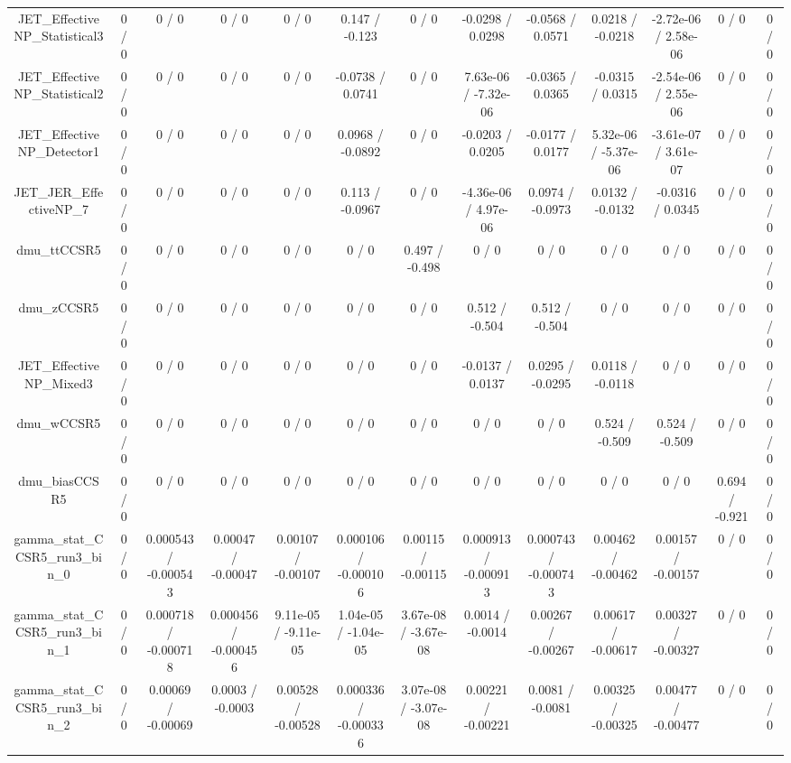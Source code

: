 \documentclass[10pt]{article}
\begin{document}
\begin{table}[htbp]
\begin{center}
\begin{tabular}{|c|c|c|c|c|c|c|c|c|c|c|c|c|}
  JET_EffectiveNP_Statistical3 & 0 / 0 & 0 / 0 & 0 / 0 & 0 / 0 & 0.147 / -0.123 & 0 / 0 & -0.0298 / 0.0298 & -0.0568 / 0.0571 & 0.0218 / -0.0218 & -2.72e-06 / 2.58e-06 & 0 / 0 & 0 / 0 \\ 
  JET_EffectiveNP_Statistical2 & 0 / 0 & 0 / 0 & 0 / 0 & 0 / 0 & -0.0738 / 0.0741 & 0 / 0 & 7.63e-06 / -7.32e-06 & -0.0365 / 0.0365 & -0.0315 / 0.0315 & -2.54e-06 / 2.55e-06 & 0 / 0 & 0 / 0 \\ 
  JET_EffectiveNP_Detector1 & 0 / 0 & 0 / 0 & 0 / 0 & 0 / 0 & 0.0968 / -0.0892 & 0 / 0 & -0.0203 / 0.0205 & -0.0177 / 0.0177 & 5.32e-06 / -5.37e-06 & -3.61e-07 / 3.61e-07 & 0 / 0 & 0 / 0 \\ 
  JET_JER_EffectiveNP_7 & 0 / 0 & 0 / 0 & 0 / 0 & 0 / 0 & 0.113 / -0.0967 & 0 / 0 & -4.36e-06 / 4.97e-06 & 0.0974 / -0.0973 & 0.0132 / -0.0132 & -0.0316 / 0.0345 & 0 / 0 & 0 / 0 \\ 
  dmu_ttCCSR5 & 0 / 0 & 0 / 0 & 0 / 0 & 0 / 0 & 0 / 0 & 0.497 / -0.498 & 0 / 0 & 0 / 0 & 0 / 0 & 0 / 0 & 0 / 0 & 0 / 0 \\ 
  dmu_zCCSR5 & 0 / 0 & 0 / 0 & 0 / 0 & 0 / 0 & 0 / 0 & 0 / 0 & 0.512 / -0.504 & 0.512 / -0.504 & 0 / 0 & 0 / 0 & 0 / 0 & 0 / 0 \\ 
  JET_EffectiveNP_Mixed3 & 0 / 0 & 0 / 0 & 0 / 0 & 0 / 0 & 0 / 0 & 0 / 0 & -0.0137 / 0.0137 & 0.0295 / -0.0295 & 0.0118 / -0.0118 & 0 / 0 & 0 / 0 & 0 / 0 \\ 
  dmu_wCCSR5 & 0 / 0 & 0 / 0 & 0 / 0 & 0 / 0 & 0 / 0 & 0 / 0 & 0 / 0 & 0 / 0 & 0.524 / -0.509 & 0.524 / -0.509 & 0 / 0 & 0 / 0 \\ 
  dmu_biasCCSR5 & 0 / 0 & 0 / 0 & 0 / 0 & 0 / 0 & 0 / 0 & 0 / 0 & 0 / 0 & 0 / 0 & 0 / 0 & 0 / 0 & 0.694 / -0.921 & 0 / 0 \\ 
  gamma_stat_CCSR5_run3_bin_0 & 0 / 0 & 0.000543 / -0.000543 & 0.00047 / -0.00047 & 0.00107 / -0.00107 & 0.000106 / -0.000106 & 0.00115 / -0.00115 & 0.000913 / -0.000913 & 0.000743 / -0.000743 & 0.00462 / -0.00462 & 0.00157 / -0.00157 & 0 / 0 & 0 / 0 \\ 
  gamma_stat_CCSR5_run3_bin_1 & 0 / 0 & 0.000718 / -0.000718 & 0.000456 / -0.000456 & 9.11e-05 / -9.11e-05 & 1.04e-05 / -1.04e-05 & 3.67e-08 / -3.67e-08 & 0.0014 / -0.0014 & 0.00267 / -0.00267 & 0.00617 / -0.00617 & 0.00327 / -0.00327 & 0 / 0 & 0 / 0 \\ 
  gamma_stat_CCSR5_run3_bin_2 & 0 / 0 & 0.00069 / -0.00069 & 0.0003 / -0.0003 & 0.00528 / -0.00528 & 0.000336 / -0.000336 & 3.07e-08 / -3.07e-08 & 0.00221 / -0.00221 & 0.0081 / -0.0081 & 0.00325 / -0.00325 & 0.00477 / -0.00477 & 0 / 0 & 0 / 0 \\ 

\end{tabular}
\end{center}
\end{table}
\end{document}
